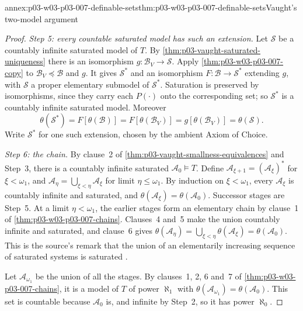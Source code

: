 \begin{annexitem}{annex:p03-w03-p03-007-definable-sets}{thm:p03-w03-p03-007-definable-sets}{Vaught's two-model argument}
\begin{proof}
\emph{Step 5: every countable saturated model has such an extension.} Let
\(\mathcal S\) be a countably infinite saturated model of \(T\). By
\cref{thm:p03-vaught-saturated-uniqueness} there is an isomorphism
\(g\colon\mathcal B_V\to\mathcal S\). Apply \cref{thm:p03-w03-p03-007-copy}
to \(\mathcal B_V\preccurlyeq\mathcal B\) and \(g\). It gives
\(\mathcal S^*\) and an isomorphism \(F\colon\mathcal B\to\mathcal S^*\)
extending \(g\), with \(\mathcal S\) a proper elementary submodel of
\(\mathcal S^*\). Saturation is preserved by isomorphisms, since they carry
each \(P(\cdot)\) onto the corresponding set; so \(\mathcal S^*\) is a
countably infinite saturated model. Moreover
\[
 \theta(\mathcal S^*)=F[\theta(\mathcal B)]=F[\theta(\mathcal B_V)]
 =g[\theta(\mathcal B_V)]=\theta(\mathcal S).
\]
Write \(\mathcal S^*\) for one such extension, chosen by the ambient Axiom of
Choice.

\emph{Step 6: the chain.} By clause~2 of
\cref{thm:p03-vaught-smallness-equivalences} and Step~3, there is a countably
infinite saturated \(\mathcal A_0\models T\). Define
\(\mathcal A_{\xi+1}=(\mathcal A_\xi)^*\) for \(\xi<\omega_1\), and
\(\mathcal A_\eta=\bigcup_{\xi<\eta}\mathcal A_\xi\) for limit
\(\eta\le\omega_1\). By induction on \(\xi<\omega_1\), every
\(\mathcal A_\xi\) is countably infinite and saturated, and
\(\theta(\mathcal A_\xi)=\theta(\mathcal A_0)\). Successor stages are
Step~5. At a limit \(\eta<\omega_1\), the earlier stages form an elementary
chain by clause~1 of \cref{thm:p03-w03-p03-007-chains}. Clauses~4 and~5
make the union countably infinite and saturated, and clause~6 gives
\(\theta(\mathcal A_\eta)=\bigcup_{\xi<\eta}\theta(\mathcal A_\xi)=\theta(\mathcal A_0)\).
This is the source's remark that the union of an elementarily increasing
sequence of saturated systems is saturated \cite[p.~318]{Vaught1961}.

Let \(\mathcal A_{\omega_1}\) be the union of all the stages. By clauses~1,
2, 6 and~7 of \cref{thm:p03-w03-p03-007-chains}, it is a model of \(T\) of
power \(\aleph_1\) with
\(\theta(\mathcal A_{\omega_1})=\theta(\mathcal A_0)\). This set is countable
because \(\mathcal A_0\) is, and infinite by Step~2, so it has power
\(\aleph_0\).


\end{proof}
\end{annexitem}
